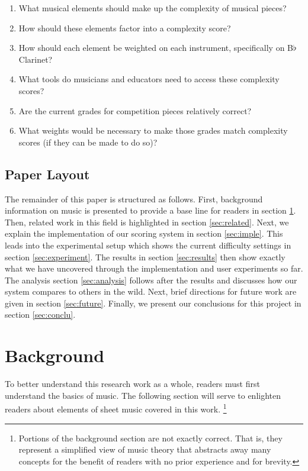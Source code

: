 \documentclass[10pt,preprint]{sigplanconf}
\begin{document}
{\begin{enumerate}
\item What musical elements should make up the complexity of musical pieces?
\item How should these elements factor into a complexity score?
\item How should each element be weighted on each instrument, specifically on B$\flat$ Clarinet?
\item What tools do musicians and educators need to access these complexity scores?
\item Are the current grades for competition pieces relatively correct?
\item What weights would be necessary to make those grades match complexity scores (if they can be made to do so)?
\end{enumerate}


\subsection{Paper Layout} 
\label{sec:layout}

The remainder of this paper is structured as follows. First, background information on music is presented to provide a base line for readers in section \ref{sec:background}. Then, related work in this field is highlighted in section \ref{sec:related}. Next, we explain the implementation of our scoring system in section \ref{sec:imple}. This leads into the experimental setup which shows the current difficulty settings in section \ref{sec:experiment}. The results in section \ref{sec:results} then show exactly what we have uncovered through the implementation and user experiments so far. The analysis section \ref{sec:analysis} follows after the results and discusses how our system compares to others in the wild. Next, brief directions for future work are given in section \ref{sec:future}. Finally, we present our conclusions for this project in section \ref{sec:conclu}.

\section{Background} 
\label{sec:background}

To better understand this research work as a whole, readers must first understand the basics of music. The following section will serve to enlighten readers about elements of sheet music covered in this work. \footnote{Portions of the background section are not exactly correct. That is, they represent a simplified view of music theory that abstracts away many concepts for the benefit of readers with no prior experience and for brevity.}

}
\end{document}

